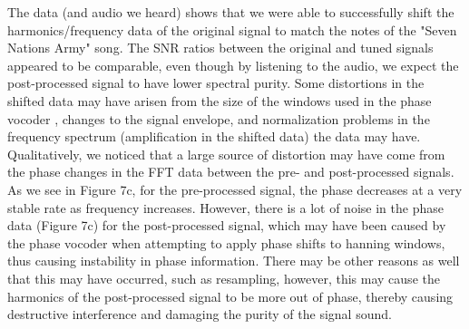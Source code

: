 \documentclass{article}
\begin{document}
    The data (and audio we heard) shows that we were able to successfully shift the harmonics/frequency data of the original signal to match the notes of the "Seven Nations Army" song. The SNR ratios between the original and tuned signals appeared to be comparable, even though by listening to the audio, we expect the post-processed signal to have lower spectral purity. Some distortions in the shifted data may have arisen from the size of the windows used in the phase vocoder , changes to the signal envelope, and normalization problems in the frequency spectrum (amplification in the shifted data) the data may have. Qualitatively, we noticed that a large source of distortion may have come from the phase changes in the FFT data between the pre- and post-processed signals. As we see in Figure 7c, for the pre-processed signal, the phase decreases at a very stable rate as frequency increases. However, there is a lot of noise in the phase data (Figure 7c) for the post-processed signal, which may have been caused by the phase vocoder when attempting to apply phase shifts to hanning windows, thus causing instability in phase information. There may be other reasons as well that this may have occurred, such as resampling, however, this may cause the harmonics of the post-processed signal to be more out of phase, thereby causing destructive interference and damaging the purity of the signal sound.
\end{document}
